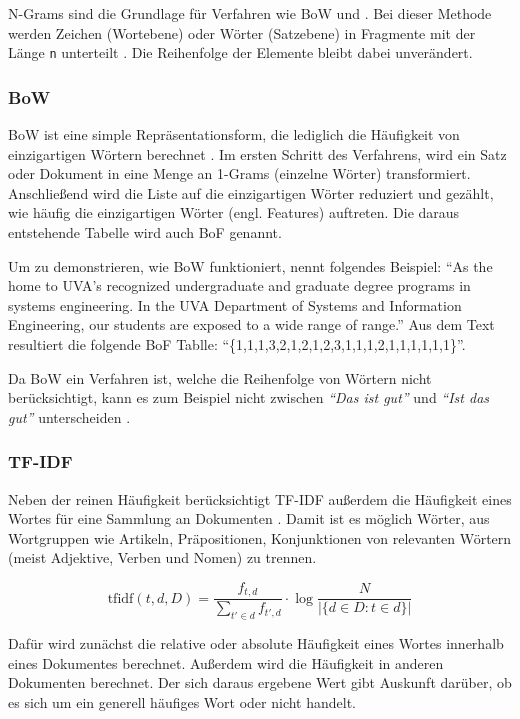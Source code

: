 N-Grams sind die Grundlage für Verfahren wie \ac{BoW} und \ft. Bei dieser Methode werden Zeichen (Wortebene) oder Wörter (Satzebene) in Fragmente mit der Länge \texttt{n} unterteilt \autocite[5]{kowsari_text_2019}. Die Reihenfolge der Elemente bleibt dabei unverändert.

\subsubsection*{\acl{BoW}} 

\ac{BoW} ist eine simple Repräsentationsform, die lediglich die Häufigkeit von einzigartigen Wörtern berechnet \autocite[6]{kowsari_text_2019}. Im ersten Schritt des Verfahrens, wird ein Satz oder Dokument in eine Menge an 1-Grams (einzelne Wörter) transformiert. Anschließend wird die Liste auf die einzigartigen Wörter reduziert und gezählt, wie häufig die einzigartigen Wörter (engl. Features) auftreten. Die daraus entstehende Tabelle wird auch \ac{BoF} genannt.

Um zu demonstrieren, wie \ac{BoW} funktioniert, nennt \textcite[6]{kowsari_text_2019} folgendes Beispiel: \enquote{As the home to UVA’s recognized undergraduate and graduate degree programs in systems engineering. In the UVA Department of Systems and Information Engineering, our students are exposed to a wide range of range.} Aus dem Text resultiert die folgende \ac{BoF} Tablle: \enquote{\{1,1,1,3,2,1,2,1,2,3,1,1,1,2,1,1,1,1,1,1\}}.

Da \ac{BoW} ein Verfahren ist, welche die Reihenfolge von Wörtern nicht berücksichtigt, kann es zum Beispiel nicht zwischen \textit{\enquote{Das ist gut}} und \textit{\enquote{Ist das gut}} unterscheiden \autocite[6]{kowsari_text_2019}.

\subsubsection*{\acl{TF-IDF}}

Neben der reinen Häufigkeit berücksichtigt \ac{TF-IDF} außerdem die Häufigkeit eines Wortes für eine Sammlung an Dokumenten \autocite[7]{kowsari_text_2019}. Damit ist es möglich Wörter, aus Wortgruppen wie Artikeln, Präpositionen, Konjunktionen von relevanten Wörtern (meist Adjektive, Verben und Nomen) zu trennen.

\[\mathrm{tfidf}(t,d,D) = \frac{f_{t,d}}{{\sum_{t' \in d}{f_{t',d}}}} \cdot \log \frac{N}{|\{d \in D: t \in d\}|}\]

Dafür wird zunächst die relative oder absolute Häufigkeit eines Wortes innerhalb eines Dokumentes berechnet. Außerdem wird die Häufigkeit in anderen Dokumenten berechnet. Der sich daraus ergebene Wert gibt Auskunft darüber, ob es sich um ein generell häufiges Wort oder nicht handelt.

